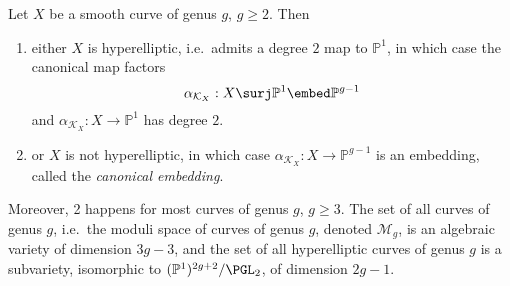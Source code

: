 \documentclass[a4paper]{article}
\renewcommand*{\P}{\mathbb{P}}
\begin{document}
\begin{proposition}
  Let \(X\) be a smooth curve of genus \(g\), \(g \geq 2\). Then
  \begin{enumerate}
  \item either \(X\) is hyperelliptic, i.e.\ admits a degree \(2\) map to \(\P^1\), in which case the canonical map factors
    \[
      \alpha_{\mathcal K_X}: X \surj \P^1 \embed \P^{g - 1}
    \]
    and \(\alpha_{\mathcal K_X}: X \to \P^1\) has degree \(2\).
  \item or \(X\) is not hyperelliptic, in which case \(\alpha_{\mathcal K_X}: X \to \P^{g - 1}\) is an embedding, called the \emph{canonical embedding}.
  \end{enumerate}
  Moreover, 2 happens for most curves of genus \(g\), \(g \geq 3\). The set of all curves of genus \(g\), i.e.\ the moduli space of curves of genus \(g\), denoted \(\mathcal M_g\), is an algebraic variety of dimension \(3g - 3\), and the set of all hyperelliptic curves of genus \(g\) is a subvariety, isomorphic to \((\P^1)^{2g + 2}/\PGL_2\), of dimension \(2g - 1\).
\end{proposition}
\end{document}
